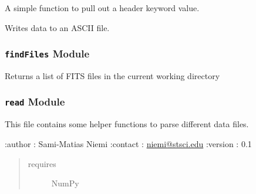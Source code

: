 \documentclass[letterpaper,10pt,english]{sphinxmanual}
\begin{document}
\begin{fulllineitems}

\begin{fulllineitems}
\label{SamPy.smnIO:SamPy.smnIO.IO.COSHBIO.HeaderKeyword}
A simple function to pull out a header keyword value.

\end{fulllineitems}



\begin{fulllineitems}
\label{SamPy.smnIO:SamPy.smnIO.IO.COSHBIO.writeToASCIIFile}
Writes data to an ASCII file.

\end{fulllineitems}


\end{fulllineitems}



\subsubsection{\texttt{findFiles} Module}
\label{SamPy.smnIO:findfiles-module}\label{SamPy.smnIO:module-SamPy.smnIO.findFiles}

\begin{fulllineitems}
\label{SamPy.smnIO:SamPy.smnIO.findFiles.findFitsFiles}
Returns a list of FITS files
in the current working directory

\end{fulllineitems}



\subsubsection{\texttt{read} Module}
\label{SamPy.smnIO:module-SamPy.smnIO.read}\label{SamPy.smnIO:read-module}
This file contains some helper functions to
parse different data files.

:author : Sami-Matias Niemi
:contact : \href{mailto:niemi@stsci.edu}{niemi@stsci.edu}
:version : 0.1
\begin{quote}\begin{description}
\item[{requires}] \leavevmode
NumPy

\end{description}\end{quote}
\end{document}
